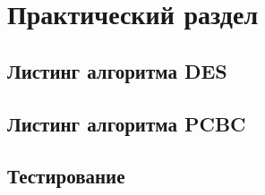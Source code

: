 \chapter{Практический раздел}

\section{Листинг алгоритма DES}

\section{Листинг алгоритма PCBC}

\section{Тестирование}